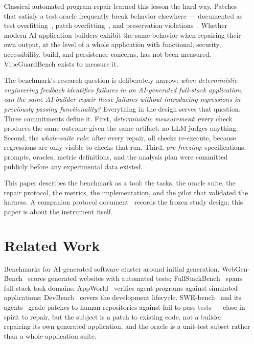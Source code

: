 \documentclass[conference]{IEEEtran}
\begin{document}
Classical automated program repair learned this lesson the hard way. Patches that
satisfy a test oracle frequently break behavior elsewhere --- documented as test
overfitting~\cite{smith2015cure}, patch overfitting~\cite{petke2024patch}, and
preservation violations~\cite{ismayilzada2023poracle}. Whether modern AI
application builders exhibit the same behavior when repairing their own output, at
the level of a whole application with functional, security, accessibility, build,
and persistence concerns, has not been measured. VibeGuardBench exists to measure
it.

The benchmark's research question is deliberately narrow: \textit{when
deterministic engineering feedback identifies failures in an AI-generated
full-stack application, can the same AI builder repair those failures without
introducing regressions in previously passing functionality?} Everything in the
design serves that question. Three commitments define it. First,
\emph{deterministic measurement}: every check produces the same outcome given the
same artifact; no LLM judges anything. Second, the \emph{whole-suite rule}: after
every repair, all checks re-execute, because regressions are only visible to
checks that run. Third, \emph{pre-freezing}: specifications, prompts, oracles,
metric definitions, and the analysis plan were committed publicly before any
experimental data existed.

This paper describes the benchmark as a tool: the tasks, the oracle suite, the
repair protocol, the metrics, the implementation, and the pilot that validated the
harness. A companion protocol document~\cite{vgbprotocol} records the frozen study
design; this paper is about the instrument itself.

\section{Related Work}
Benchmarks for AI-generated software cluster around initial generation.
WebGen-Bench~\cite{lu2025webgen} scores generated websites with automated tests;
FullStackBench~\cite{byte2025fullstack} spans full-stack task domains;
AppWorld~\cite{trivedi2024appworld} verifies agent programs against simulated
applications; DevBench~\cite{li2024devbench} covers the development lifecycle.
SWE-bench~\cite{jimenez2024swebench} and its agents~\cite{yang2024sweagent,
xia2024agentless, zhang2024autocoderover} grade patches to human repositories
against fail-to-pass tests --- close in spirit to repair, but the subject is a
patch to existing code, not a builder repairing its own generated application,
and the oracle is a unit-test subset rather than a whole-application suite.
\end{document}
